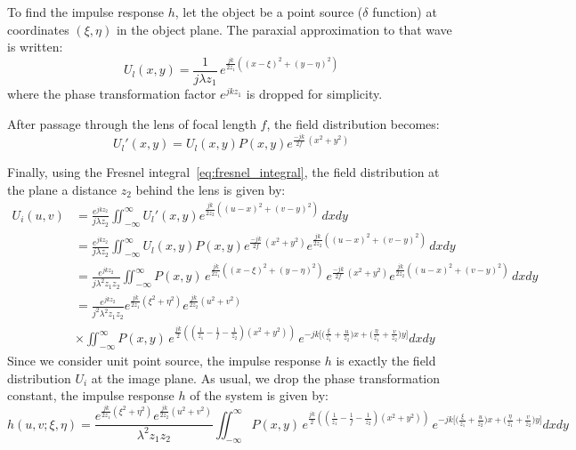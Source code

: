 \documentclass{article}
\begin{document}
To find the impulse response $h$, let the object be a point source ($\delta$ function) at coordinates $(\xi, \eta)$ in the object plane. The paraxial approximation to that wave is written:
\begin{equation}
    U_l(x, y) = \frac{1}{j\lambda z_1} \, e^{\frac{jk}{2z_1}((x-\xi)^2 + (y-\eta)^2)}
\end{equation}
where the phase transformation factor $e^{jkz_1}$ is dropped for simplicity. 

After passage through the lens of focal length $f$, the field distribution becomes:
\begin{equation}
    U_l'(x,y) = U_l(x,y) P(x,y) e^{\frac{-jk}{2f} \, (x^2 + y^2)}
\end{equation}

Finally, using the Fresnel integral~\cref{eq:fresnel_integral}, the field distribution at the plane a distance $z_2$ behind the lens is given by:
\begin{align}
    U_i(u,v) &= \frac{e^{jkz_2}}{j\lambda z_2} \iint_{-\infty}^{\infty} U_l'(x,y) e^{\frac{jk}{2z_2}\left((u-x)^2 + (v-y)^2\right)} \, dx dy \\
    &= \frac{e^{jkz_2}}{j\lambda z_2} \iint_{-\infty}^{\infty} U_l(x,y) P(x,y) e^{\frac{-jk}{2f} \, (x^2 + y^2)} e^{\frac{jk}{2z_2}\left((u-x)^2 + (v-y)^2\right)} \, dx dy\\
    &= \frac{e^{jkz_2}}{j\lambda^2 z_1 z_2} \iint_{-\infty}^{\infty}  P(x,y) \, e^{\frac{jk}{2z_1}((x-\xi)^2 + (y-\eta)^2)} \, e^{\frac{-jk}{2f} \, (x^2 + y^2)} e^{\frac{jk}{2z_2}\left((u-x)^2 + (v-y)^2\right)} \, dx dy \\
    &= \frac{e^{jkz_2}}{j^2 \lambda^2 z_1 z_2}
    e^{\frac{jk}{2z_1}(\xi^2 + \eta^2)} e^{\frac{jk}{2z_2}(u^2 + v^2)} \\
    & \times \iint_{-\infty}^{\infty}  P(x,y) \, e^{\frac{jk}{2}\left(\left(\frac{1}{z_1} - \frac{1}{f} - \frac{1}{z_2}\right)(x^2 + y^2) \right)} 
    \, e^{-jk\big[\big(\frac{\xi}{z_1} + \frac{u}{z_2}\big)x + \big(\frac{\eta}{z_1} + \frac{v}{z_2}\big)y\big]} 
    dx dy  
\end{align} 
Since we consider unit point source, the impulse response $h$ is exactly the field distribution $U_i$ at the image plane. 
As usual, we drop the phase transformation constant, the impulse response $h$ of the system is given by:
\begin{equation}\label{eq:impulse_response_lens_complete}
    h(u,v; \xi, \eta) = \frac{e^{\frac{jk}{2z_1}(\xi^2 + \eta^2)} e^{\frac{jk}{2z_2}(u^2 + v^2)}}{\lambda^2 z_1 z_2}
    \iint_{-\infty}^{\infty} P(x,y) \, e^{\frac{jk}{2}\left(\left(\frac{1}{z_1} - \frac{1}{f} - \frac{1}{z_2}\right)(x^2 + y^2) \right)} 
    \, e^{-jk\big[\big(\frac{\xi}{z_1} + \frac{u}{z_2}\big)x + \big(\frac{\eta}{z_1} + \frac{v}{z_2}\big)y\big]} 
    dx dy  
\end{equation}
\end{document}

